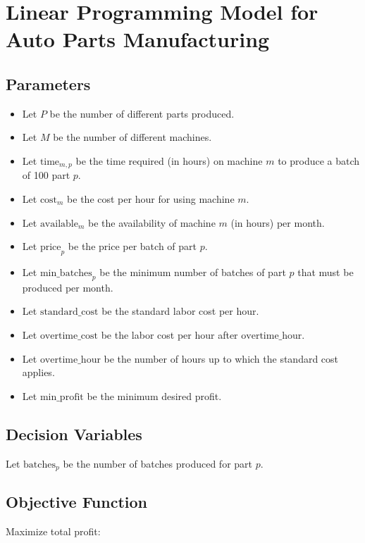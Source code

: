 \documentclass{article}
\begin{document}
\section*{Linear Programming Model for Auto Parts Manufacturing}

\subsection*{Parameters}
\begin{itemize}
    \item Let \( P \) be the number of different parts produced.
    \item Let \( M \) be the number of different machines.
    \item Let \( \text{time}_{m,p} \) be the time required (in hours) on machine \( m \) to produce a batch of 100 part \( p \).
    \item Let \( \text{cost}_{m} \) be the cost per hour for using machine \( m \).
    \item Let \( \text{available}_{m} \) be the availability of machine \( m \) (in hours) per month.
    \item Let \( \text{price}_{p} \) be the price per batch of part \( p \).
    \item Let \( \text{min\_batches}_{p} \) be the minimum number of batches of part \( p \) that must be produced per month.
    \item Let \( \text{standard\_cost} \) be the standard labor cost per hour.
    \item Let \( \text{overtime\_cost} \) be the labor cost per hour after \( \text{overtime\_hour} \).
    \item Let \( \text{overtime\_hour} \) be the number of hours up to which the standard cost applies.
    \item Let \( \text{min\_profit} \) be the minimum desired profit.
\end{itemize}

\subsection*{Decision Variables}
Let \( \text{batches}_{p} \) be the number of batches produced for part \( p \).

\subsection*{Objective Function}
Maximize total profit:
\end{document}
